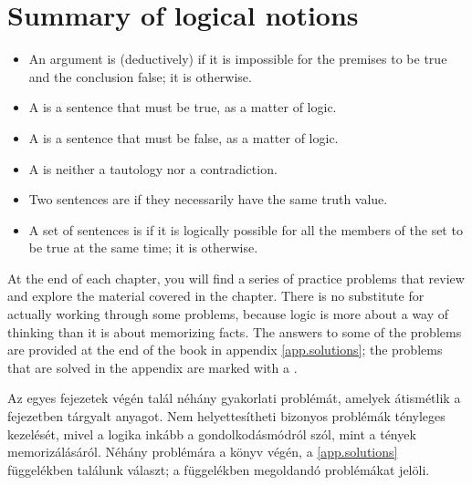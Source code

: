 \section*{Summary of logical notions}
\begin{itemize}
\item An argument is (deductively)  if it is impossible for the premises to be true and the conclusion false; it is  otherwise.

\item A  is a sentence that must be true, as a matter of logic.

\item A  is a sentence that must be false, as a matter of logic.

\item A  is neither a tautology nor a contradiction.

\item Two sentences are  if they necessarily have the same truth value.

\item A set of sentences is  if it is logically possible for all the members of the set to be true at the same time; it is  otherwise.
\end{itemize}



\practiceproblems
At the end of each chapter, you will find a series of practice problems that review and explore the material covered in the chapter. There is no substitute for actually working through some problems, because logic is more about a way of thinking than it is about memorizing facts. The answers to some of the problems are provided at the end of the book in appendix \ref{app.solutions}; the problems that are solved in the appendix are marked with a \solutions.

\practiceproblems
Az egyes fejezetek végén talál néhány gyakorlati problémát, amelyek átismétlik a fejezetben tárgyalt anyagot. Nem helyettesítheti bizonyos problémák tényleges kezelését, mivel a logika inkább a gondolkodásmódról szól, mint a tények memorizálásáról. Néhány problémára a könyv végén, a \ref{app.solutions} függelékben találunk választ; a függelékben megoldandó problémákat \solutions jelöli.

